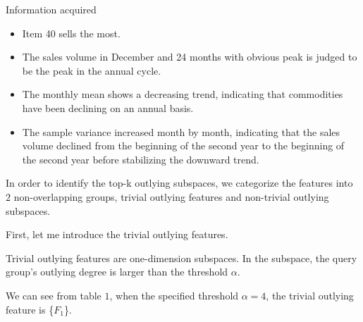 \documentclass[
 size=14pt,
 paper=smartboard,  %
 mode=present, 		%
 display=slides, 	%
 style=tuliplab,  	%
 pauseslide,
 fleqn,leqno]{powerdot}
\begin{document}


\begin{slide}[toc=,bm=]{Information acquired}
\begin{itemize}
\item
Item 40 sells the most.


\item
The sales volume in December and 24 months with obvious peak is judged to be the peak in the annual cycle.

\item
The monthly mean shows a decreasing trend, indicating that commodities have been declining on an annual basis.
\item
The sample variance increased month by month, indicating that the sales volume declined from the beginning of the second year to the beginning of the second year before stabilizing the downward trend.
\end{itemize}

\begin{note}
In order to identify the top-k outlying subspaces,
we categorize the features into $2$ non-overlapping groups,
trivial outlying features and non-trivial outlying subspaces.

First, let me introduce the trivial outlying features.

Trivial outlying features are one-dimension subspaces.
In the subspace,
the query group's outlying degree is larger than the threshold $\alpha$.

We can see from table $1$,
when the specified threshold $\alpha = 4$,
the trivial outlying feature is \{$F_1$\}.
\end{note}

\end{slide}


\end{document}
